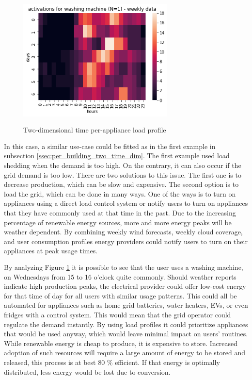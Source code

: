 \begin{figure}[H]
	\centering
	\caption{Two-dimensional time per-appliance load profile}
	\includegraphics[width=0.7\textwidth]{../Figures/LPS/wm_hm_weekly.png}
	\label{fig:wm_hm_weekly}
\end{figure}

In this case, a similar use-case could be fitted as in the first example in subsection \ref{ssec:per_building_two_time_dim}.
The first example used load shedding when the demand is too high.
On the contrary, it can also occur if the grid demand is too low.
There are two solutions to this issue.
The first one is to decrease production, which can be slow and expensive.
The second option is to load the grid, which can be done in many ways.
One of the ways is to turn on appliances using a direct load control system or notify users to turn on appliances that they have commonly used at that time in the past. 
Due to the increasing percentage of renewable energy sources, more and more energy peaks will be weather dependent.
By combining weekly wind forecasts, weekly cloud coverage, and user consumption profiles energy providers could notify users to turn on their appliances at peak usage times.


By analyzing Figure \ref{fig:wm_hm_weekly} it is possible to see that the user uses a washing machine,
on Wednesdays from  15 to 16 o'clock quite commonly. 
Should weather reports indicate high production peaks, the electrical provider could offer low-cost energy for that time of day for all users with similar usage patterns. 
This could all be automated for appliances such as home grid batteries, water heaters, EVs, or even fridges with a control system.
This would mean that the grid operator could regulate the demand instantly.
By using load profiles it could prioritize appliances that would be used anyway, which would leave minimal impact on users' routines. 
While renewable energy is cheap to produce, it is expensive to store.
Increased adoption of such resources will require a large amount of energy to be stored and released, this process is at best 80 \% efficient.
If that energy is optimally distributed, less energy would be lost due to conversion.

